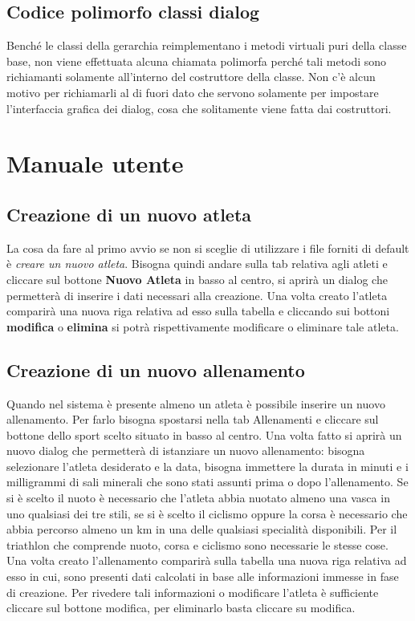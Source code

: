 \documentclass[10pt, a4paper]{article}
\begin{document}
\subsection{Codice polimorfo classi dialog}
Benché le classi della gerarchia reimplementano i metodi virtuali puri della classe base, non viene effettuata alcuna chiamata 
polimorfa perché tali metodi sono richiamanti solamente all'interno del costruttore della classe. Non c'è alcun motivo per
richiamarli al di fuori dato che servono solamente per impostare l'interfaccia grafica dei dialog, cosa che solitamente viene
fatta dai costruttori.
 
\section{Manuale utente}
\subsection{Creazione di un nuovo atleta}
La cosa da fare al primo avvio se non si sceglie di utilizzare i file forniti di default è  \emph{creare un nuovo atleta}.
Bisogna quindi andare sulla tab relativa agli atleti e cliccare sul bottone \textbf{Nuovo Atleta} in basso al centro, si aprirà
un dialog che permetterà di inserire i dati necessari alla creazione. Una volta creato l'atleta comparirà una nuova riga relativa ad esso
sulla tabella e cliccando sui bottoni \textbf{modifica} o  \textbf{elimina} si potrà  rispettivamente modificare o eliminare tale atleta.

\subsection{Creazione di un nuovo allenamento}
Quando nel sistema è presente almeno un atleta è possibile inserire un nuovo allenamento.
Per farlo bisogna spostarsi nella tab Allenamenti e cliccare sul bottone dello sport scelto situato in basso al centro.
Una volta fatto si aprirà un nuovo dialog che permetterà di istanziare un nuovo allenamento: bisogna selezionare l'atleta desiderato e la data, bisogna  immettere la durata in minuti e i milligrammi di sali minerali che sono stati assunti prima o dopo l'allenamento. Se si è scelto il nuoto
è necessario che l'atleta abbia nuotato almeno una vasca in uno qualsiasi dei tre stili, se si è scelto il ciclismo oppure
la corsa è necessario che abbia percorso almeno un km in una delle qualsiasi specialità disponibili. Per il triathlon che comprende nuoto, corsa e ciclismo sono necessarie le stesse cose.
Una volta creato l'allenamento comparirà sulla tabella una nuova riga relativa ad esso in cui, sono presenti dati calcolati in base alle informazioni immesse in fase di creazione.
Per rivedere tali informazioni o modificare l'atleta è sufficiente cliccare
sul bottone modifica, per eliminarlo basta cliccare su modifica.
\end{document}
